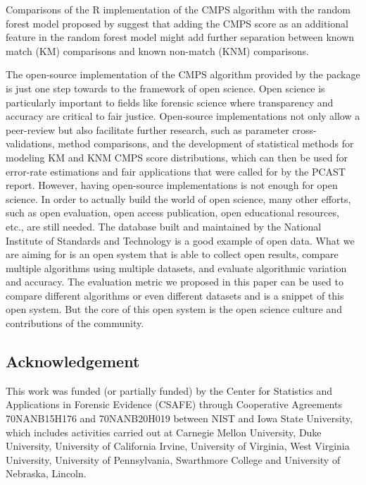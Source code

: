 Comparisons of the R implementation of the CMPS algorithm with the
random forest model proposed by \citet{aoas} suggest that adding the
CMPS score as an additional feature in the random forest model might add
further separation between known match (KM) comparisons and known
non-match (KNM) comparisons.

The open-source implementation of the CMPS algorithm provided by the
 package is just one step towards to the framework of open
science. Open science is particularly important to fields like forensic
science where transparency and accuracy are critical to fair justice.
Open-source implementations not only allow a peer-review but also
facilitate further research, such as parameter cross-validations, method
comparisons, and the development of statistical methods for modeling KM
and KNM CMPS score distributions, which can then be used for error-rate
estimations and fair applications that were called for by the PCAST
\citep{pcast} report. However, having open-source implementations is not
enough for open science. In order to actually build the world of open
science, many other efforts, such as open evaluation, open access
publication, open educational resources, etc., are still needed. The
database built and maintained by the National Institute of Standards and
Technology is a good example of open data. What we are aiming for is an
open system that is able to collect open results, compare multiple
algorithms using multiple datasets, and evaluate algorithmic variation
and accuracy. The evaluation metric we proposed in this paper can be
used to compare different algorithms or even different datasets and is a
snippet of this open system. But the core of this open system is the
open science culture and contributions of the community.

\hypertarget{acknowledgement}{%
\subsection{Acknowledgement}\label{acknowledgement}}

This work was funded (or partially funded) by the Center for Statistics
and Applications in Forensic Evidence (CSAFE) through Cooperative
Agreements 70NANB15H176 and 70NANB20H019 between NIST and Iowa State
University, which includes activities carried out at Carnegie Mellon
University, Duke University, University of California Irvine, University
of Virginia, West Virginia University, University of Pennsylvania,
Swarthmore College and University of Nebraska, Lincoln.

